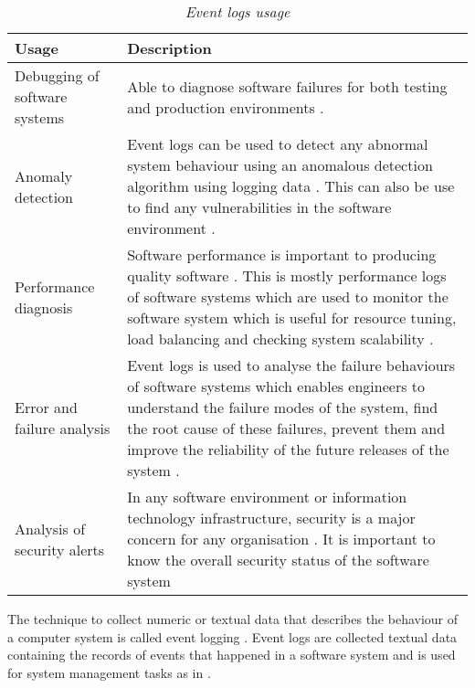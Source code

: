 \begin{table}[!htb]
	\centering
	\small
	\caption[Event logs usage]
	{\textit{Event logs usage}}
	\label{tbl:CH1_EventLogsUsage}
	\begin{tabularx}{\textwidth}{|l|X|}
		\hline \textbf{Usage} & \textbf{Description} \\
		\hline Debugging of software systems & Able to diagnose software failures for both testing and production environments \cite{Rong2018a}.\\
		\hline Anomaly detection & Event logs can be used to detect any abnormal system behaviour using an anomalous detection algorithm using logging data \cite{Gurumdimma2016}.  This can also be use to find any vulnerabilities in the software environment \cite{Dwyer2013}. \\
		\hline Performance diagnosis & Software performance is important to producing quality software \cite{EvangelinGeetha2007,Baccanico2014}. This is mostly performance logs of software systems which are used to monitor the software system which is useful for resource tuning, load balancing and checking system scalability \cite{Song2017}. \\ 
		\hline Error and failure analysis & Event logs is used to analyse the failure behaviours of software systems which enables engineers to understand the failure modes of the system, find the root cause of these failures, prevent them and improve the reliability of the future releases of the system \cite{Cinque2013}.\\
		\hline Analysis of security alerts & In any software environment or information technology infrastructure, security is a major concern for any organisation \cite{Pathan2014, Dwyer2013}. It is important to know the overall security status of the software system \\
		\hline
	\end{tabularx}
\end{table}

The technique to collect numeric or textual data that describes the behaviour of a computer system is called event logging \cite{Pecchia2015, Baccanico2014}. Event logs are collected textual data containing the records of events that happened in a software system and is used for system management tasks as in  \cite{Rong2018a, Rong2018, Baccanico2014}.

